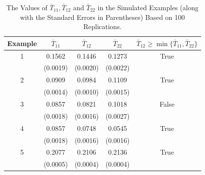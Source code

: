 \documentclass[twoside]{article}
\newcommand{\0}{\mathbf{0}}
\newcommand{\1}{\mathbf{1}}
\numberwithin{equation}{section}
\begin{document}
\begin{table}[H]
\renewcommand{\arraystretch}{1.25}
\caption{The Values of $\bar{T}_{11},\bar{T}_{12}$ and $\bar{T}_{22}$ in the Simulated Examples (along with the Standard Errors in Parentheses) Based on 100 Replications.}\label{tab3}
\vspace{0.5cm}
\small
\centering
\begin{tabular}{|c|c|c|c|c|}
\hline
Example  &$\bar{T}_{11}$& $\bar{T}_{12}$&$\bar{T}_{22}$&$\bar{T}_{12}\geq \min\{\bar{T}_{11},\bar{T}_{22}\}$\\
\hline
1 & 0.1562 & 0.1446 & 0.1273 & True \\
    & (0.0019) & (0.0020) & (0.0022)& \\ \hline
2 & 0.0909 & 0.0984 & 0.1109& True \\
    & (0.0014) & (0.0010) & (0.0015)& \\ \hline
3 & 0.0857 & 0.0821 & 0.1018 & False\\
    & (0.0018) & (0.0016) & (0.0027)& \\ \hline
4 & 0.0857 & 0.0748 & 0.0545 & True\\
    & (0.0018) & (0.0016) & (0.0016)& \\ \hline
5 & 0.2077 & 0.2106 & 0.2136 & True\\
    & (0.0005) & (0.0004) & (0.0004)& \\ \hline
\end{tabular}
\label{order.d1.d2}
\end{table}
\end{document}
